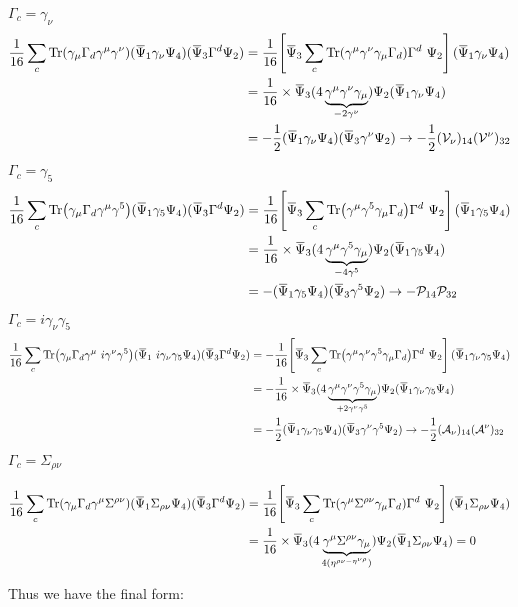 \begin{itemize}
    \underline{$\Gamma_c = \gamma_\nu$}
    \begin{align*}
        \frac{1}{16}\sum\limits_{c} \Tr(\gamma_\mu\Gamma_d \gamma^\mu\gamma^\nu ) (\dadj{\Psi}_1 \gamma_\nu \Psi_4)(\dadj{\Psi}_3\Gamma^d \Psi_2) &= \frac{1}{16}\qty[\dadj{\Psi}_3 \sum\limits_c \Tr( \gamma^\mu \gamma^\nu \gamma_\mu \Gamma_d )\Gamma^d\ \Psi_2](\dadj{\Psi}_1\gamma_\nu \Psi_4) \\
        &=\frac{1}{16}\times  \dadj{\Psi}_3 (4\underbrace{ \gamma^\mu\gamma^\nu \gamma_\mu}_{-2\gamma^\nu})\Psi_2 (\dadj{\Psi}_1 \gamma_\nu\Psi_4)\\
        &=-\frac{1}{2}(\dadj{\Psi}_1\gamma_\nu \Psi_4)(\dadj{\Psi}_3\gamma^\nu \Psi_2) \rightarrow -\frac{1}{2}(\SV_\nu)_{14}(\SV^\nu)_{32}
    \end{align*}
\underline{$\Gamma_c = \gamma_5$}
    \begin{align*}
        \frac{1}{16}\sum\limits_{c} \Tr(\gamma_\mu\Gamma_d \gamma^\mu\gamma^5 ) (\dadj{\Psi}_1 \gamma_5 \Psi_4)(\dadj{\Psi}_3\Gamma^d \Psi_2) &= \frac{1}{16}\qty[\dadj{\Psi}_3 \sum\limits_c \Tr( \gamma^\mu \gamma^5 \gamma_\mu \Gamma_d )\Gamma^d\ \Psi_2](\dadj{\Psi}_1\gamma_5 \Psi_4) \\
        &=\frac{1}{16}\times  \dadj{\Psi}_3 (4\underbrace{ \gamma^\mu\gamma^5 \gamma_\mu}_{-4\gamma^5})\Psi_2 (\dadj{\Psi}_1\gamma_5 \Psi_4)\\
        &=-(\dadj{\Psi}_1\gamma_5 \Psi_4)(\dadj{\Psi}_3\gamma^5 \Psi_2) \rightarrow -\SP_{14}\SP_{32}
    \end{align*}
    \underline{$\Gamma_c = i\gamma_\nu\gamma_5$}
    \begin{align*}
        \frac{1}{16}\sum\limits_{c} \Tr(\gamma_\mu\Gamma_d \gamma^\mu \ i\gamma^\nu\gamma^5 ) (\dadj{\Psi}_1 \ i\gamma_\nu\gamma_5 \Psi_4)(\dadj{\Psi}_3\Gamma^d \Psi_2) &= -\frac{1}{16}\qty[\dadj{\Psi}_3 \sum\limits_c \Tr( \gamma^\mu \gamma^\nu\gamma^5 \gamma_\mu \Gamma_d )\Gamma^d\ \Psi_2](\dadj{\Psi}_1\gamma_\nu\gamma_5 \Psi_4) \\
        &=-\frac{1}{16}\times  \dadj{\Psi}_3 (4\underbrace{ \gamma^\mu\gamma^\nu\gamma^5 \gamma_\mu}_{+2\gamma^\nu\gamma^5})\Psi_2 (\dadj{\Psi}_1\gamma_\nu\gamma_5 \Psi_4)\\
        &=-\frac{1}{2}(\dadj{\Psi}_1\gamma_\nu\gamma_5 \Psi_4)(\dadj{\Psi}_3\gamma^\nu\gamma^5 \Psi_2) \rightarrow -\frac{1}{2}(\SA_\nu)_{14}(\SA^\nu)_{32}
    \end{align*}
     \underline{$\Gamma_c =\Sigma_{\rho\nu}$}

    \begin{align*}
        \frac{1}{16}\sum\limits_{c} \Tr(\gamma_\mu\Gamma_d \gamma^\mu\Sigma^{\rho\nu} ) (\dadj{\Psi}_1 \Sigma_{\rho\nu} \Psi_4)(\dadj{\Psi}_3\Gamma^d \Psi_2) &= \frac{1}{16}\qty[\dadj{\Psi}_3 \sum\limits_c \Tr( \gamma^\mu \Sigma^{\rho\nu} \gamma_\mu \Gamma_d )\Gamma^d\ \Psi_2](\dadj{\Psi}_1\Sigma_{\rho\nu} \Psi_4) \\
        &=\frac{1}{16}\times  \dadj{\Psi}_3 (4\underbrace{ \gamma^\mu\Sigma^{\rho\nu} \gamma_\mu}_{4(\eta^{\rho\nu - \eta^{\nu\rho}})})\Psi_2 (\dadj{\Psi}_1\Sigma_{\rho\nu} \Psi_4)=0
    \end{align*}
\end{itemize}
Thus we have the final form:

